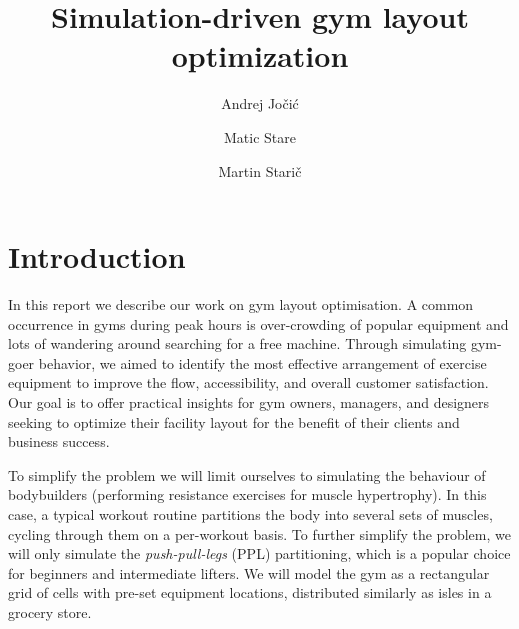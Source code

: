\documentclass[9pt]{pnas-new}
\title{Simulation-driven gym layout optimization}
\author{Andrej Jočić}
\author{Matic Stare}
\author{Martin Starič}
\affil{Collective behaviour course research seminar report}
\begin{document}
\verticaladjustment{-2pt}

\maketitle
\thispagestyle{firststyle}

\section*{Introduction}
In this report we describe our work on gym layout optimisation.
A common occurrence in gyms during peak hours is over-crowding of popular equipment and lots of wandering around searching for a free machine.
Through simulating gym-goer behavior, we aimed to identify the most effective arrangement of exercise equipment to improve the flow, accessibility, and overall customer satisfaction.
Our goal is to offer practical insights for gym owners, managers, and designers seeking to optimize their facility layout for the benefit of their clients and business success.

To simplify the problem
we will limit ourselves to simulating the behaviour of bodybuilders (performing resistance exercises for muscle hypertrophy).
In this case, a typical workout routine partitions the body into several sets of muscles, cycling through them on a per-workout basis.
To further simplify the problem, we will only simulate the
\textit{push-pull-legs} (PPL) partitioning, which is a popular choice for beginners and intermediate lifters.
We will model the gym as a rectangular grid of cells with pre-set equipment locations, distributed similarly as isles in a grocery store.
\end{document}
